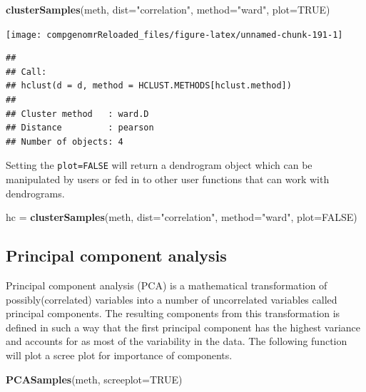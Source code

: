 \documentclass[12pt,]{krantz}
\newenvironment{Shaded}{\begin{snugshade}}{\end{snugshade}}
\newcommand{\DataTypeTok}[1]{\textcolor[rgb]{0.13,0.29,0.53}{#1}}
\newcommand{\KeywordTok}[1]{\textcolor[rgb]{0.13,0.29,0.53}{\textbf{#1}}}
\newcommand{\NormalTok}[1]{#1}
\newcommand{\OtherTok}[1]{\textcolor[rgb]{0.56,0.35,0.01}{#1}}
\newcommand{\StringTok}[1]{\textcolor[rgb]{0.31,0.60,0.02}{#1}}
\begin{document}
\begin{Shaded}
\begin{Highlighting}[]
\KeywordTok{clusterSamples}\NormalTok{(meth, }\DataTypeTok{dist=}\StringTok{"correlation"}\NormalTok{, }\DataTypeTok{method=}\StringTok{"ward"}\NormalTok{, }\DataTypeTok{plot=}\OtherTok{TRUE}\NormalTok{)}
\end{Highlighting}
\end{Shaded}

\begin{center}\texttt{[image: compgenomrReloaded\_files/figure-latex/unnamed-chunk-191-1]} \end{center}

\begin{verbatim}
## 
## Call:
## hclust(d = d, method = HCLUST.METHODS[hclust.method])
## 
## Cluster method   : ward.D 
## Distance         : pearson 
## Number of objects: 4
\end{verbatim}

Setting the \texttt{plot=FALSE} will return a dendrogram object which can be manipulated by users or fed in to other user functions that can work with dendrograms.

\begin{Shaded}
\begin{Highlighting}[]
\NormalTok{hc =}\StringTok{ }\KeywordTok{clusterSamples}\NormalTok{(meth, }\DataTypeTok{dist=}\StringTok{"correlation"}\NormalTok{, }\DataTypeTok{method=}\StringTok{"ward"}\NormalTok{, }\DataTypeTok{plot=}\OtherTok{FALSE}\NormalTok{)}
\end{Highlighting}
\end{Shaded}

\hypertarget{principal-component-analysis-1}{%
\subsection{Principal component analysis}\label{principal-component-analysis-1}}

Principal component analysis (PCA) is a mathematical transformation of possibly(correlated) variables into a number of uncorrelated variables called principal components. The resulting components from this transformation is defined in such a way that the first principal component has the highest variance and accounts for as most of the variability in the data. The following function will plot a scree plot for importance of components.

\begin{Shaded}
\begin{Highlighting}[]
\KeywordTok{PCASamples}\NormalTok{(meth, }\DataTypeTok{screeplot=}\OtherTok{TRUE}\NormalTok{)}
\end{Highlighting}
\end{Shaded}
\end{document}
